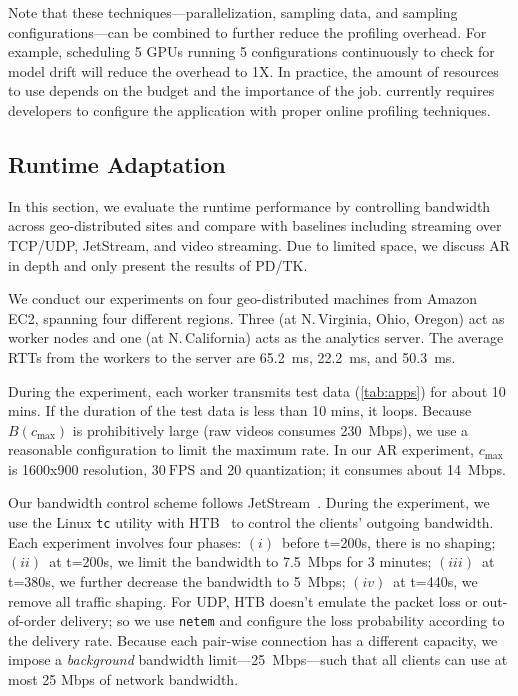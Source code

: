 Note that these techniques---parallelization, sampling data, and sampling
configurations---can be combined to further reduce the profiling overhead. For
example, scheduling 5 GPUs running 5 configurations continuously to check for
model drift will reduce the overhead to 1X\@. In practice, the amount of
resources to use depends on the budget and the importance of the job. \awstream{}
currently requires developers to configure the application with proper online
profiling techniques.


\subsection{Runtime Adaptation}
\label{sec:runtime-adaptation}

In this section, we evaluate the runtime performance by controlling bandwidth
across geo-distributed sites and compare \awstream{} with baselines including
streaming over TCP/UDP, JetStream, and video streaming. Due to limited space, we
discuss AR in depth and only present the results of PD/TK.

 We conduct our experiments on four geo-distributed
machines from Amazon EC2, spanning four different regions. Three (at
N.\,Virginia, Ohio, Oregon) act as worker nodes and one (at N.\,California) acts
as the analytics server. The average RTTs from the workers to the server are
\SI{65.2}{\ms}, \SI{22.2}{\ms}, and \SI{50.3}{ms}.

During the experiment, each worker transmits test data (\autoref{tab:apps}) for
about 10 mins. If the duration of the test data is less than 10 mins, it
loops. Because $B(c_{\max})$ is prohibitively large (raw videos consumes
\SI{230}{Mbps}), we use a reasonable configuration to limit the maximum rate. In
our AR experiment, $c_{\max}$ is 1600x900 resolution, \(30~\text{FPS}\) and 20
quantization; it consumes about \SI{14}{Mbps}.

Our bandwidth control scheme follows JetStream~\cite{rabkin2014aggregation}.
During the experiment, we use the Linux \texttt{tc} utility with HTB~\cite{htb,
  lartc} to control the clients' outgoing bandwidth. Each experiment involves
four phases: $(i)$~before t=200s, there is no shaping; $(ii)$~at t=200s, we
limit the bandwidth to \SI{7.5}{Mbps} for 3 minutes; $(iii)$~at t=380s, we
further decrease the bandwidth to \SI{5}{Mbps}; $(iv)$~at t=440s, we remove all
traffic shaping. For UDP, HTB doesn't emulate the packet loss or out-of-order
delivery; so we use \texttt{netem} and configure the loss probability according
to the delivery rate. Because each pair-wise connection has a different
capacity, we impose a \textit{background} bandwidth limit---\SI{25}{Mbps}---such
that all clients can use at most 25 Mbps of network bandwidth.

